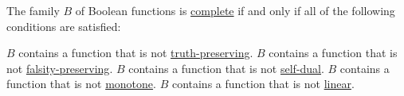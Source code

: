 \begin{theorem}\label{thm:posts_completeness_theorem}
  The family \( B \) of Boolean functions is \hyperref[def:boolean_closure]{complete} if and only if all of the following conditions are satisfied:
  \begin{thmenum}
     \( B \) contains a function that is not \hyperref[def:boolean_functions_in_f2/truth_preserving]{truth-preserving}.
     \( B \) contains a function that is not \hyperref[def:boolean_functions_in_f2/falsity_preserving]{falsity-preserving}.
     \( B \) contains a function that is not \hyperref[def:boolean_functions_in_f2/self_dual]{self-dual}.
     \( B \) contains a function that is not \hyperref[def:boolean_functions_in_f2/monotone]{monotone}.
     \( B \) contains a function that is not \hyperref[def:boolean_functions_in_f2/linear]{linear}.
  \end{thmenum}
\end{theorem}

